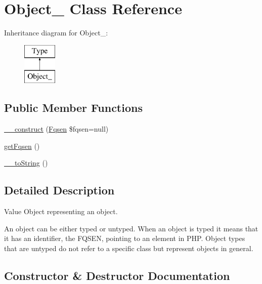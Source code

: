 \hypertarget{classphp_documentor_1_1_reflection_1_1_types_1_1_object__}{}\section{Object\+\_\+ Class Reference}
\label{classphp_documentor_1_1_reflection_1_1_types_1_1_object__}
Inheritance diagram for Object\+\_\+\+:\begin{figure}[H]
\begin{center}
\leavevmode
\includegraphics[height=2.000000cm]{classphp_documentor_1_1_reflection_1_1_types_1_1_object__}
\end{center}
\end{figure}
\subsection*{Public Member Functions}
\begin{DoxyCompactItemize}
\item 
\mbox{\hyperlink{classphp_documentor_1_1_reflection_1_1_types_1_1_object___a7c0c7072ac1ab862732713e682843e37}{\+\_\+\+\_\+construct}} (\mbox{\hyperlink{classphp_documentor_1_1_reflection_1_1_fqsen}{Fqsen}} \$fqsen=null)
\item 
\mbox{\hyperlink{classphp_documentor_1_1_reflection_1_1_types_1_1_object___a07132fe536354352c87e6447d512bf3b}{get\+Fqsen}} ()
\item 
\mbox{\hyperlink{classphp_documentor_1_1_reflection_1_1_types_1_1_object___a7516ca30af0db3cdbf9a7739b48ce91d}{\+\_\+\+\_\+to\+String}} ()
\end{DoxyCompactItemize}


\subsection{Detailed Description}
Value Object representing an object.

An object can be either typed or untyped. When an object is typed it means that it has an identifier, the F\+Q\+S\+EN, pointing to an element in P\+HP. Object types that are untyped do not refer to a specific class but represent objects in general. 

\subsection{Constructor \& Destructor Documentation}
\mbox{\label{classphp_documentor_1_1_reflection_1_1_types_1_1_object___a7c0c7072ac1ab862732713e682843e37}} 
